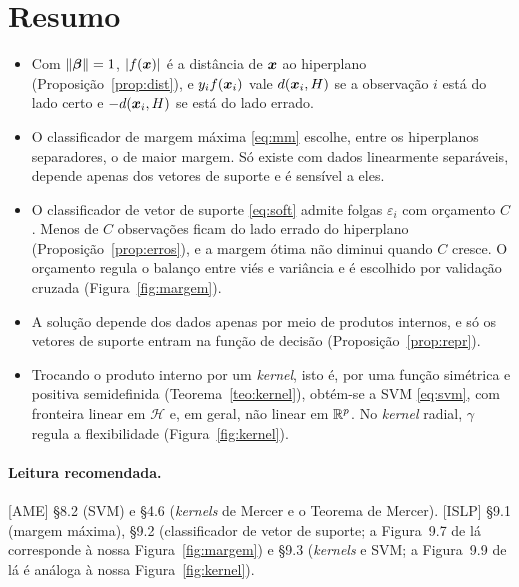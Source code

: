 \documentclass[11pt,a4paper]{article}
\begin{document}
\section*{Resumo}
\begin{itemize}[leftmargin=1.4cm]
  \item Com $\left\lVert \bm{\beta} \right\rVert=1$, $\left\lvert f(\bm{x}) \right\rvert$ é a distância de $\bm{x}$ ao hiperplano
        (Proposição~\ref{prop:dist}), e $y_if(\bm{x}_i)$ vale $d(\bm{x}_i,H)$ se a observação
        $i$ está do lado certo e $-d(\bm{x}_i,H)$ se está do lado errado.
  \item O classificador de margem máxima \eqref{eq:mm} escolhe, entre os hiperplanos
        separadores, o de maior margem. Só existe com dados linearmente separáveis,
        depende apenas dos vetores de suporte e é sensível a eles.
  \item O classificador de vetor de suporte \eqref{eq:soft} admite folgas
        $\varepsilon_i$ com orçamento $C$. Menos de $C$ observações ficam do lado
        errado do hiperplano (Proposição~\ref{prop:erros}), e a margem ótima não
        diminui quando $C$ cresce. O orçamento regula o balanço entre viés e
        variância e é escolhido por validação cruzada (Figura~\ref{fig:margem}).
  \item A solução depende dos dados apenas por meio de produtos internos, e só os
        vetores de suporte entram na função de decisão
        (Proposição~\ref{prop:repr}).
  \item Trocando o produto interno por um \emph{kernel}, isto é, por uma função
        simétrica e positiva semidefinida (Teorema~\ref{teo:kernel}), obtém-se a SVM
        \eqref{eq:svm}, com fronteira linear em $\mathcal H$ e, em geral, não linear
        em $\mathbb{R}^p$. No \emph{kernel} radial, $\gamma$ regula a flexibilidade
        (Figura~\ref{fig:kernel}).
\end{itemize}

\paragraph{Leitura recomendada.} [AME] §8.2 (SVM) e §4.6 (\emph{kernels} de Mercer e o
Teorema de Mercer). [ISLP] §9.1 (margem máxima), §9.2 (classificador de vetor de
suporte; a Figura~9.7 de lá corresponde à nossa Figura~\ref{fig:margem}) e §9.3
(\emph{kernels} e SVM; a Figura~9.9 de lá é análoga à nossa Figura~\ref{fig:kernel}).
\end{document}
